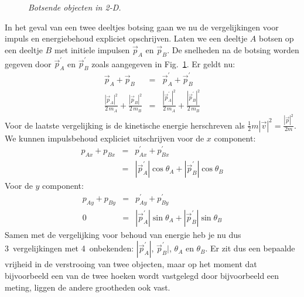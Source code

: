  \begin{figure}[htbp]
\begin{center}
\caption{{\it Botsende objecten in 2-D.}}
\label{fig:bots2d}
\end{center}
\end{figure} 
In het geval van een twee deeltjes botsing gaan we nu de vergelijkingen voor impuls en energiebehoud
expliciet opschrijven. Laten we een deeltje $A$  botsen op een deeltje $B$ met initiele impulsen 
$\vec{p}_A$ en $\vec{p}_B$. De snelheden na de botsing worden gegeven door $\vec{p}_A^{\prime}$ en
$\vec{p}_B^{\prime}$ zoals aangegeven in Fig.~\ref{fig:bots2d}. Er geldt nu:
\begin{eqnarray}\label{eq:epbehoud}
\vec{p}_A +\vec{p}_B & = & \vec{p}_A^{\prime} + \vec{p}_B^{\prime} \\
\frac{|\vec{p}_A|^2}{2\,m_A}+\frac{|\vec{p}_B|^2}{2\,m_B} & = & \frac{|\vec{p}_A^{\prime}|^2}{2\,m_A}+\frac{|\vec{p}_B^{\prime}|^2}{2\,m_B}
\end{eqnarray}
Voor de laatste vergelijking is de kinetische energie herschreven als $\frac{1}{2}m|\vec{v}|^2 = \frac{|\vec{p}|^2}{2m}$. 
We kunnen impulsbehoud expliciet uitschrijven voor de $x$ component:
\begin{eqnarray}\label{eq:bots_px}
p_{Ax} + p_{Bx} & = & p_{Ax}^{\prime} + p_{Bx}^{\prime} \\
                             & = & |\vec{p}_A^{\prime}|\cos\theta_A + |\vec{p}_B^{\prime}|\cos\theta_B
\end{eqnarray}
Voor de $y$ component:
\begin{eqnarray}\label{eq:bots_py}
p_{Ay} + p_{By} & = & p_{Ay}^{\prime} + p_{By}^{\prime} \\
                          0 & = & |\vec{p}_A^{\prime}|\sin\theta_A + |\vec{p}_B^{\prime}|\sin\theta_B
\end{eqnarray}
Samen met de vergelijking voor behoud van energie heb je nu dus 3~vergelijkingen met
4~onbekenden: $|\vec{p}_A^{\prime}|$, $\vec{p}_B^{\prime}|$, $\theta_A$ en $\theta_B$. Er zit dus een 
bepaalde vrijheid in de verstrooing van twee objecten, maar op het moment dat bijvoorbeeld een van de twee 
hoeken wordt vastgelegd door bijvoorbeeld een meting, liggen de andere grootheden ook vast.

